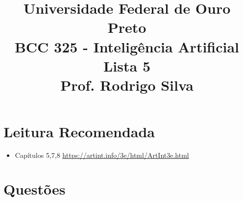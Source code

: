 \documentclass{article}
\title{\vspace{-2 cm} Universidade Federal de Ouro Preto \\ BCC 325 - Inteligência Artificial \\ Lista 5 \\ Prof. Rodrigo Silva}
\date{}
\begin{document}
\maketitle

\section{Leitura Recomendada}

\begin{itemize}
    \item Capítulos 5,7,8 \url{https://artint.info/3e/html/ArtInt3e.html}
\end{itemize}

\section{Questões}
\end{document}
